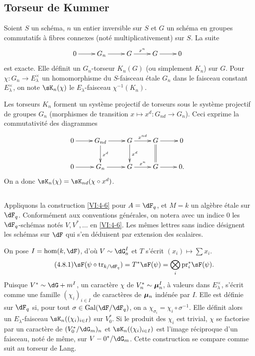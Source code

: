 \subsection{Torseur de Kummer}\label{VI:4-7}

Soient $S$ un sch\'ema, $n$ un entier inversible sur $S$ et $G$ un sch\'ema en 
groupes commutatifs \`a fibres connexes (not\'e multiplicativement) sur $S$. 
La suite 
\[\xymatrix{
  0 \ar[r] 
    & G_n \ar[r] 
    & G \ar[r]^-{x^n} 
    & G \ar[r] 
    & 0 
}\]
est exacte. Elle d\'efinit un $G_n$-torseur $K_n(G)$ (ou simplement $K_n$) sur 
$G$. Pour $\chi:G_n \to E_\lambda^\times$ un homomorphisme du $S$-faisceau 
\'etale $G_n$ dans le faisceau constant $E_\lambda^\times$, on note 
$\sK_n(\chi)$ le $E_\lambda$-faisceau $\chi^{-1}(K_n)$. 

Les torseurs $K_n$ forment un syst\`eme projectif de torseurs sous le 
syst\`eme projectif de groupes $G_n$ (morphismes de transition 
$x\mapsto x^d:G_{n d}\to G_n$). Ceci exprime la commutativit\'e des diagrammes 
\[\xymatrix{
  0 \ar[r] 
    & G_{n d} \ar[r] \ar[d]^-{x^d} 
    & G \ar[r]^-{x^{n d}} \ar[d]^-{x^d} 
    & G \ar[r] \ar@{=}[d] 
    & 0 \\
  0 \ar[r] 
    & G_n \ar[r] 
    & G \ar[r]^-{x^n} 
    & G \ar[r] 
    & 0 \text{.} 
}\]
On a donc $\sK_n(\chi) = \sK_{n d}(\chi\circ x^d)$. 





\subsection{}\label{VI:4-8}

Appliquons la construction \ref{VI:4-6} pour $A=\dF_q$, et $M=k$ un alg\`ebre 
\'etale sur $\dF_q$. Conform\'ement aux conventions g\'en\'erales, on notera 
avec un indice $0$ les $\dF_q$-sch\'emas not\'es $V,V^\ast,\ldots$ en 
\ref{VI:4-6}. Les m\^emes lettres sans indice d\'esignent les sch\'emas sur 
$\dF$ qui s'en d\'eduisent par extension des scalaires. 

On pose $I=\hom(k,\dF)$, d'o\`u $V\sim \dG_a^I$ et $T$ s'\'ecrit 
$(x_i)\mapsto \sum x_i$. 
\begin{equation*}\tag{4.8.1}\label{VI:eq:4-8-1}
  \sF(\psi\circ \tr_{k/\dF_q}) = T^\ast \sF(\psi) = \bigotimes_i \pr_i^\ast \sF(\psi) \text{.} 
\end{equation*}
Puisque $V^\ast\sim \dG+m^I$, un caract\`ere $\chi$ de $V_n^\ast\sim {\bm\mu}_n^I$, 
\`a valeurs dans $E_\lambda^\times$, s'\'ecrit comme une famille 
$(\chi_i)_{i\in I}$ de caract\`eres de ${\bm\mu}_n$ ind\'en\'ee par $I$. Elle est 
d\'efinie sur $\dF_q$ si, pour tout $\sigma\in \gal(\dF/\dF_q)$, on a 
$\chi_{\sigma_i} = \chi_i\circ \sigma^{-1}$. Elle d\'efinit alors un 
$E_\lambda$-faisceau $\sK_n((\chi_i)_{i\in I})$ sur $V_0^\ast$. Si le produit 
des $\chi_i$ est trivial, $\chi$ se factorise par un caract\`ere de 
$(V_0^\ast/\dG_m)_n$ et $\sK_n((\chi_i)_{i\in I})$ est l'image r\'eciproque 
d'un faisceau, not\'e de m\^eme, sur $V-0^\ast/\dG_m$. Cette construction se 
compare comme suit au torseur de Lang. 





